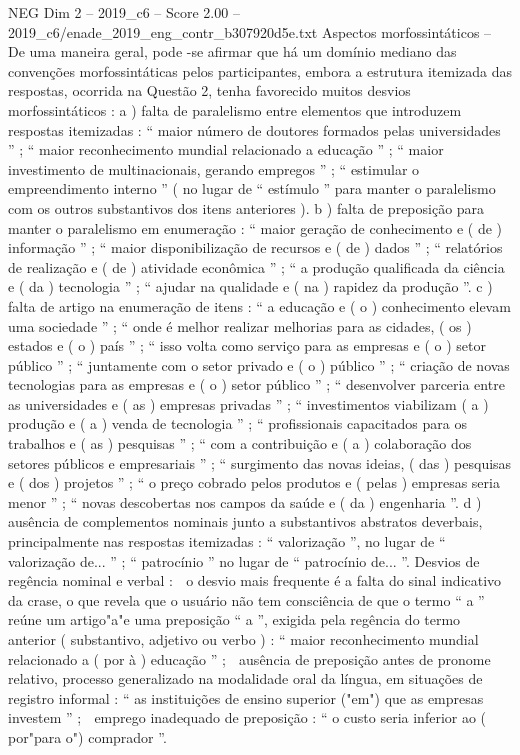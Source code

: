 \begin{textsample}{NEG Dim 2 – 2019\_c6 – Score 2.00 – 2019\_c6/enade\_2019\_eng\_contr\_b307920d5e.txt}
Aspectos morfossintáticos – De uma maneira geral, pode -se afirmar que há um domínio mediano das convenções morfossintáticas pelos participantes, embora a estrutura itemizada das respostas, ocorrida na Questão 2, tenha favorecido muitos desvios morfossintáticos : a ) falta de paralelismo entre elementos que introduzem respostas itemizadas : “ maior número de doutores formados pelas universidades ” ; “ maior reconhecimento mundial relacionado a educação ” ; “ maior investimento de multinacionais, gerando empregos ” ; “ estimular o empreendimento interno ” ( no lugar de “ estímulo ” para manter o paralelismo com os outros substantivos dos itens anteriores ). b ) falta de preposição para manter o paralelismo em enumeração : “ maior geração de conhecimento e ( de ) informação ” ; “ maior disponibilização de recursos e ( de ) dados ” ; “ relatórios de realização e ( de ) atividade econômica ” ; “ a produção qualificada da ciência e ( da ) tecnologia ” ; “ ajudar na qualidade e ( na ) rapidez da produção ”. c ) falta de artigo na enumeração de itens : “ a educação e ( o ) conhecimento elevam uma sociedade ” ; “ onde é melhor realizar melhorias para as cidades, ( os ) estados e ( o ) país ” ; “ isso volta como serviço para as empresas e ( o ) setor público ” ; “ juntamente com o setor privado e ( o ) público ” ; “ criação de novas tecnologias para as empresas e ( o ) setor público ” ; “ desenvolver parceria entre as universidades e ( as ) empresas privadas ” ; “ investimentos viabilizam ( a ) produção e ( a ) venda de tecnologia ” ; “ profissionais capacitados para os trabalhos e ( as ) pesquisas ” ; “ com a contribuição e ( a ) colaboração dos setores públicos e empresariais ” ; “ surgimento das novas ideias, ( das ) pesquisas e ( dos ) projetos ” ; “ o preço cobrado pelos produtos e ( pelas ) empresas seria menor ” ; “ novas descobertas nos campos da saúde e ( da ) engenharia ”. d ) ausência de complementos nominais junto a substantivos abstratos deverbais, principalmente nas respostas itemizadas : “ valorização ”, no lugar de “ valorização de... ” ; “ patrocínio ” no lugar de “ patrocínio de... ”.
Desvios de regência nominal e verbal :  o desvio mais frequente é a falta do sinal indicativo da crase, o que revela que o usuário não tem consciência de que o termo “ a ” reúne um artigo"a"e uma preposição “ a ”, exigida pela regência do termo anterior ( substantivo, adjetivo ou verbo ) : “ maior reconhecimento mundial relacionado a ( por à ) educação ” ;  ausência de preposição antes de pronome relativo, processo generalizado na modalidade oral da língua, em situações de registro informal : “ as instituições de ensino superior ("em") que as empresas investem ” ;  emprego inadequado de preposição : “ o custo seria inferior ao ( por"para o") comprador ”.

\end{textsample}
